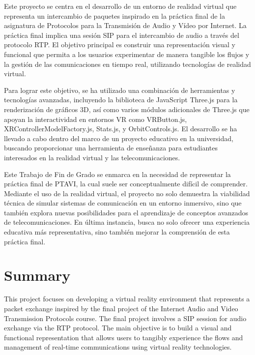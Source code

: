 \documentclass[a4paper, 12pt]{book}
\begin{document}
Este proyecto se centra en el desarrollo de un entorno de realidad virtual que representa un intercambio de paquetes inspirado en la 
práctica final de la asignatura de Protocolos para la Transmisión de Audio y Vídeo por Internet. La práctica final implica una sesión 
SIP para el intercambio de audio a través del protocolo RTP. El objetivo principal es construir una representación visual y funcional 
que permita a los usuarios experimentar de manera tangible los flujos y la gestión de las comunicaciones en tiempo real, utilizando 
tecnologías de realidad virtual.

\bigskip

Para lograr este objetivo, se ha utilizado una combinación de herramientas y tecnologías avanzadas, incluyendo la biblioteca de 
JavaScript Three.js para la renderización de gráficos 3D, así como varios módulos adicionales de Three.js que apoyan la interactividad en 
entornos VR como VRButton.js, XRControllerModelFactory.js, Stats.js, y OrbitControls.js. El desarrollo se ha llevado a cabo dentro del marco 
de un proyecto educativo en la universidad, buscando proporcionar una herramienta de enseñanza para 
estudiantes interesados en la realidad virtual y las telecomunicaciones.

\bigskip

Este Trabajo de Fin de Grado se enmarca en la necesidad de representar la práctica final de PTAVI, la cual suele ser conceptualmente difícil de 
comprender. Mediante el uso de la realidad virtual, el proyecto no solo demuestra la viabilidad técnica de simular sistemas de comunicación 
en un entorno inmersivo, sino que también explora nuevas posibilidades para el aprendizaje de conceptos avanzados de telecomunicaciones. 
En última instancia, busca no solo ofrecer una experiencia educativa más representativa, sino también mejorar la comprensión de esta práctica final.



\chapter*{Summary}

This project focuses on developing a virtual reality environment that represents a packet exchange inspired by the final project of the Internet Audio and 
Video Transmission Protocols course. The final project involves a SIP session for audio exchange via the RTP protocol. The main objective is to build a visual 
and functional representation that allows users to tangibly experience the flows and management of real-time communications using virtual reality technologies.
\end{document}

